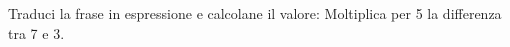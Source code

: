 \item Traduci la frase in espressione e calcolane il valore: Moltiplica per 5 la differenza tra 7 e 3.